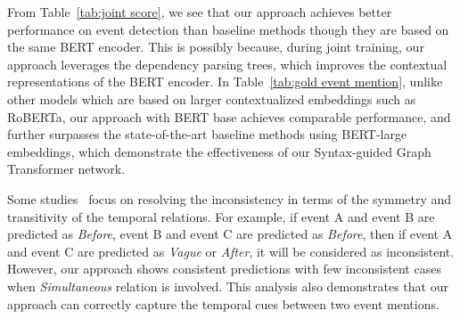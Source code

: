 From Table~\ref{tab:joint score}, we see that our approach achieves better performance on event detection than baseline methods though they are based on the same BERT encoder. This is possibly because, during joint training, our approach leverages the dependency parsing trees, which improves the contextual representations of the BERT encoder.
In Table~\ref{tab:gold event mention}, unlike other models which are based on larger contextualized embeddings such as RoBERTa, our approach with BERT base achieves comparable performance, and further surpasses the state-of-the-art baseline methods using BERT-large embeddings, which demonstrate the effectiveness of our Syntax-guided Graph Transformer network.

Some studies~\cite{ning2019improved,han2019joint,wang2020joint,zhou2020clinical} focus on resolving the inconsistency in terms of the symmetry and transitivity of the temporal relations. For example, if event A and event B are predicted as \textit{Before}, event B and event C are predicted as \textit{Before}, then if event A and event C are predicted as \textit{Vague} or \textit{After}, it will be considered as inconsistent. However, our approach shows consistent predictions with few inconsistent cases when \textit{Simultaneous} relation is involved. This analysis also demonstrates that our approach can correctly capture the temporal cues between two event mentions. 



\begin{table}[tp]
\small
\centering
{}
\caption{Evaluation on the contrast set of~\matres. Original Test indicates the accuracy on 100 examples sampled from the original~\matres~test set following~\cite{Gardner2020Evaluating}. Contrast shows the accuracy score on 401 examples perturbed from the original 100 examples. Consistency is defined as the percentage of the original 100 examples for which the model's predictions of the perturbed examples are all correct in the contrast set.}  
\label{tab:contrast}
\end{table}


